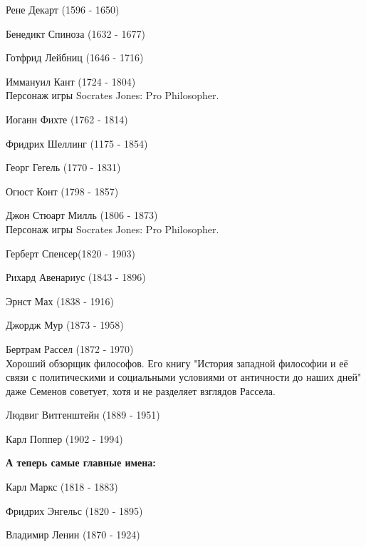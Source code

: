 Рене Декарт (1596 - 1650)

Бенедикт Спиноза (1632 - 1677)

Готфрид Лейбниц (1646 - 1716)

Иммануил Кант (1724 - 1804)\\
Персонаж игры Socrates Jones: Pro Philosopher.

Иоганн Фихте (1762 - 1814)

Фридрих Шеллинг (1175 - 1854)

Георг Гегель (1770 - 1831)

Огюст Конт (1798 - 1857)

Джон Стюарт Милль (1806 - 1873)\\
Персонаж игры Socrates Jones: Pro Philosopher.

Герберт Спенсер(1820 - 1903)

Рихард Авенариус (1843 - 1896)

Эрнст Мах (1838 - 1916)

Джордж Мур (1873 - 1958)

Бертрам Рассел (1872 - 1970)\\
Хороший обзорщик философов. Его книгу "История западной философии и её связи с политическими и социальными условиями от античности до наших дней" даже Семенов советует, хотя и не разделяет взглядов Рассела.

Людвиг Витгенштейн (1889 - 1951)

Карл Поппер (1902 - 1994)

\textbf{А теперь самые главные имена:}

Карл Маркс (1818 - 1883)

Фридрих Энгельс (1820 - 1895)

Владимир Ленин (1870 - 1924)